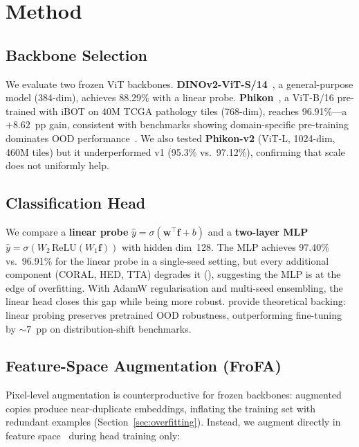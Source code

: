 \documentclass{midl}
\begin{document}
\section{Method}
\label{sec:method}

\subsection{Backbone Selection}

We evaluate two frozen ViT backbones.
\textbf{DINOv2-ViT-S/14}~\citep{oquab2023dinov2}, a general-purpose model (384-dim), achieves 88.29\% with a linear probe.
\textbf{Phikon}~\citep{filiot2023phikon}, a ViT-B/16 pre-trained with iBOT on 40M TCGA pathology tiles (768-dim), reaches 96.91\%---a $+8.62$~pp gain, consistent with benchmarks showing domain-specific pre-training dominates OOD performance~\citep{nature2025benchmark}.
We also tested \textbf{Phikon-v2} (ViT-L, 1024-dim, 460M tiles) but it underperformed v1 (95.3\% vs.\ 97.12\%), confirming that scale does not uniformly help.

\subsection{Classification Head}

We compare a \textbf{linear probe} $\hat{y} = \sigma(\mathbf{w}^\top \mathbf{f} + b)$ and a \textbf{two-layer MLP} $\hat{y} = \sigma(W_2\,\text{ReLU}(W_1 \mathbf{f}))$ with hidden dim~128.
The MLP achieves 97.40\% vs.\ 96.91\% for the linear probe in a single-seed setting, but every additional component (CORAL, HED, TTA) degrades it (), suggesting the MLP is at the edge of overfitting.
With AdamW regularisation and multi-seed ensembling, the linear head closes this gap while being more robust.
\citet{kumar2022finetuning} provide theoretical backing: linear probing preserves pretrained OOD robustness, outperforming fine-tuning by ${\sim}7$~pp on distribution-shift benchmarks.

\subsection{Feature-Space Augmentation (FroFA)}
\label{sec:frofa}

Pixel-level augmentation is counterproductive for frozen backbones: augmented copies produce near-duplicate embeddings, inflating the training set with redundant examples (Section~\ref{sec:overfitting}).
Instead, we augment directly in feature space~\citep{bar2024frofa, lim2022noisy} during head training only:
\end{document}
